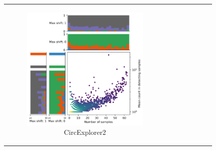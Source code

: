 \begin{figure}[H] \begin{tabular}{cc} \begin{subfigure}{.4\textwidth}
                                           \centering

                                           \includegraphics[width=\linewidth]{chapters/4_results_and_discussion/figures/detection/density/circexplorer2.png}
                                           \caption{CircExplorer2}

                                           \label{fig:detection_density_circexplorer2} \end{subfigure} &
               \begin{subfigure}{.4\textwidth} \centering


\end{subfigure}
\end{tabular}
\end{figure}
